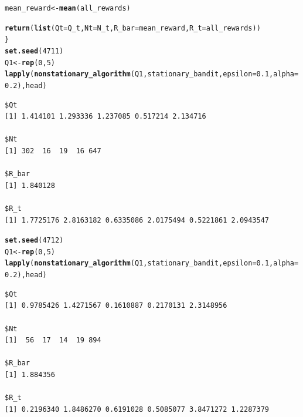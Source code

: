 \documentclass[10pt, a4paper, english]{article}\usepackage[]{graphicx}\usepackage[dvipsnames]{xcolor}
\makeatletter
\newcommand{\hlnum}[1]{\textcolor[rgb]{0.686,0.059,0.569}{#1}}%
\newcommand{\hlstd}[1]{\textcolor[rgb]{0.345,0.345,0.345}{#1}}%
\newcommand{\hlkwb}[1]{\textcolor[rgb]{0.69,0.353,0.396}{#1}}%
\newcommand{\hlkwc}[1]{\textcolor[rgb]{0.333,0.667,0.333}{#1}}%
\newcommand{\hlkwd}[1]{\textcolor[rgb]{0.737,0.353,0.396}{\textbf{#1}}}%
\newenvironment{kframe}{%
 \def\at@end@of@kframe{}%
 \ifinner\ifhmode%
  \def\at@end@of@kframe{\end{minipage}}%
  \begin{minipage}{\columnwidth}%
 \fi\fi%
 \def\FrameCommand##1{\hskip\@totalleftmargin \hskip-\fboxsep
 \colorbox{shadecolor}{##1}\hskip-\fboxsep
     \hskip-\linewidth \hskip-\@totalleftmargin \hskip\columnwidth}%
 \MakeFramed {\advance\hsize-\width
   \@totalleftmargin\z@ \linewidth\hsize
   \@setminipage}}%
 {\par\unskip\endMakeFramed%
 \at@end@of@kframe}
\newenvironment{knitrout}{}{} %
\makeatother
\begin{document}
\begin{knitrout}
\begin{kframe}
\begin{alltt}
 \hlstd{mean_reward} \hlkwb{<-} \hlkwd{mean}\hlstd{(all_rewards)}

 \hlkwd{return}\hlstd{(}\hlkwd{list}\hlstd{(}\hlkwc{Qt} \hlstd{= Q_t,} \hlkwc{Nt} \hlstd{= N_t,} \hlkwc{R_bar} \hlstd{= mean_reward,} \hlkwc{R_t} \hlstd{= all_rewards))}
\hlstd{\}}
\hlkwd{set.seed}\hlstd{(}\hlnum{4711}\hlstd{)}
\hlstd{Q1} \hlkwb{<-} \hlkwd{rep}\hlstd{(}\hlnum{0}\hlstd{,} \hlnum{5}\hlstd{)}
\hlkwd{lapply}\hlstd{(}\hlkwd{nonstationary_algorithm}\hlstd{(Q1, stationary_bandit,} \hlkwc{epsilon} \hlstd{=} \hlnum{0.1}\hlstd{,} \hlkwc{alpha}\hlstd{=}\hlnum{0.2}\hlstd{), head)}
\end{alltt}
\begin{verbatim}
$Qt
[1] 1.414101 1.293336 1.237085 0.517214 2.134716

$Nt
[1] 302  16  19  16 647

$R_bar
[1] 1.840128

$R_t
[1] 1.7725176 2.8163182 0.6335086 2.0175494 0.5221861 2.0943547
\end{verbatim}
\begin{alltt}
\hlkwd{set.seed}\hlstd{(}\hlnum{4712}\hlstd{)}
\hlstd{Q1} \hlkwb{<-} \hlkwd{rep}\hlstd{(}\hlnum{0}\hlstd{,} \hlnum{5}\hlstd{)}
\hlkwd{lapply}\hlstd{(}\hlkwd{nonstationary_algorithm}\hlstd{(Q1, stationary_bandit,} \hlkwc{epsilon} \hlstd{=} \hlnum{0.1}\hlstd{,} \hlkwc{alpha}\hlstd{=}\hlnum{0.2}\hlstd{), head)}
\end{alltt}
\begin{verbatim}
$Qt
[1] 0.9785426 1.4271567 0.1610887 0.2170131 2.3148956

$Nt
[1]  56  17  14  19 894

$R_bar
[1] 1.884356

$R_t
[1] 0.2196340 1.8486270 0.6191028 0.5085077 3.8471272 1.2287379
\end{verbatim}
\end{kframe}
\end{knitrout}
\end{document}
